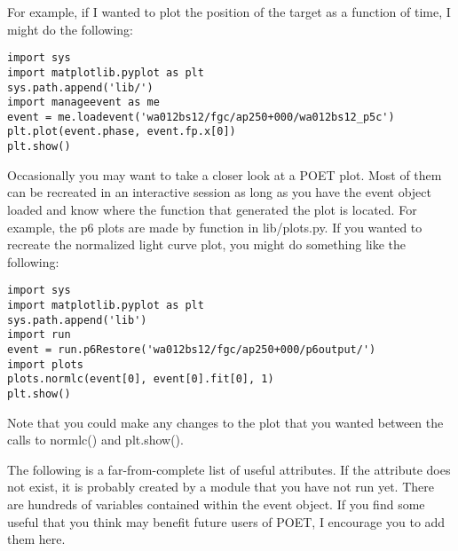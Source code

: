 \documentclass[letterpaper,12pt]{article}
\begin{document}
For example, if I wanted to plot the position of the target as a function
of time, I might do the following:

\begin{verbatim}
import sys
import matplotlib.pyplot as plt
sys.path.append('lib/')
import manageevent as me
event = me.loadevent('wa012bs12/fgc/ap250+000/wa012bs12_p5c')
plt.plot(event.phase, event.fp.x[0])
plt.show()
\end{verbatim}

Occasionally you may want to take a closer look at a POET plot. Most
of them can be recreated in an interactive session as long as you
have the event object loaded and know where the function that generated
the plot is located. For example, the p6 plots are made by function
in lib/plots.py. If you wanted to recreate the normalized light curve
plot, you might do something like the following:

\begin{verbatim}
import sys
import matplotlib.pyplot as plt
sys.path.append('lib')
import run
event = run.p6Restore('wa012bs12/fgc/ap250+000/p6output/')
import plots
plots.normlc(event[0], event[0].fit[0], 1)
plt.show()
\end{verbatim}

Note that you could make any changes to the plot that you wanted
between the calls to normlc() and plt.show().

The following is a far-from-complete list of useful attributes. If the
attribute does not exist, it is probably created by a module that you
have not run yet. There are hundreds of variables contained within the
event object. If you find some useful that you think may benefit
future users of POET, I encourage you to add them here.
\end{document}
